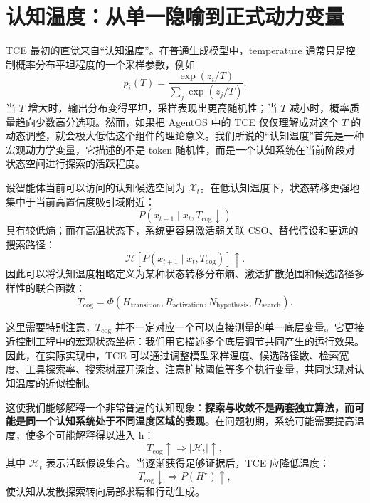 \section{认知温度：从单一隐喻到正式动力变量}

TCE 最初的直觉来自“认知温度”。在普通生成模型中，temperature 通常只是控制概率分布平坦程度的一个采样参数，例如
\begin{equation}
    p_i(T)
    =
    \frac{\exp(z_i/T)}
    {\sum_j \exp(z_j/T)}.
\end{equation}
当 $T$ 增大时，输出分布变得平坦，采样表现出更高随机性；当 $T$ 减小时，概率质量趋向少数高分选项。然而，如果把 AgentOS 中的 TCE 仅仅理解成对这个 $T$ 的动态调整，就会极大低估这个组件的理论意义。我们所说的“认知温度”首先是一种宏观动力学变量，它描述的不是 token 随机性，而是一个认知系统在当前阶段对状态空间进行探索的活跃程度。

设智能体当前可以访问的认知候选空间为 $\mathcal X_t$。在低认知温度下，状态转移更强地集中于当前高置信度吸引域附近：
\begin{equation}
    P(x_{t+1}\mid x_t,T_{\mathrm{cog}}\downarrow)
\end{equation}
具有较低熵；而在高温状态下，系统更容易激活弱关联 CSO、替代假设和更远的搜索路径：
\begin{equation}
    \mathcal H
    \left[
    P(x_{t+1}\mid x_t,T_{\mathrm{cog}})
    \right]
    \uparrow.
\end{equation}
因此可以将认知温度粗略定义为某种状态转移分布熵、激活扩散范围和候选路径多样性的联合函数：
\begin{equation}
    T_{\mathrm{cog}}
    =
    \Phi
    \left(
    H_{\mathrm{transition}},
    R_{\mathrm{activation}},
    N_{\mathrm{hypothesis}},
    D_{\mathrm{search}}
    \right).
\end{equation}

这里需要特别注意，$T_{\mathrm{cog}}$ 并不一定对应一个可以直接测量的单一底层变量。它更接近控制工程中的宏观状态坐标：我们用它描述多个底层调节共同产生的运行效果。因此，在实际实现中，TCE 可以通过调整模型采样温度、候选路径数、检索宽度、工具探索率、搜索树展开深度、注意扩散阈值等多个执行变量，共同实现对认知温度的近似控制。

这使我们能够解释一个非常普遍的认知现象：\textbf{探索与收敛不是两套独立算法，而可能是同一个认知系统处于不同温度区域的表现。}在问题初期，系统可能需要提高温度，使多个可能解释得以进入 h：
\begin{equation}
    T_{\mathrm{cog}}
    \uparrow
    \Rightarrow
    |\mathcal H_t|
    \uparrow,
\end{equation}
其中 $\mathcal H_t$ 表示活跃假设集合。当逐渐获得足够证据后，TCE 应降低温度：
\begin{equation}
    T_{\mathrm{cog}}
    \downarrow
    \Rightarrow
    P(H^\star)
    \uparrow,
\end{equation}
使认知从发散探索转向局部求精和行动生成。

